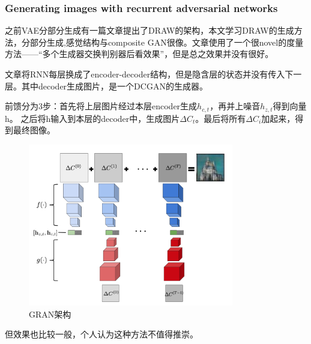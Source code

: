 \documentclass[a4paper]{article}
\begin{document}
\subsubsection{Generating images with recurrent adversarial networks\cite{gran}}
之前VAE分部分生成有一篇文章提出了DRAW的架构，本文学习DRAW的生成方法，分部分生成,感觉结构与composite GAN很像。文章使用了一个很novel的度量方法——“多个生成器交换判别器后看效果”，但是总之效果并没有很好。

文章将RNN每层换成了encoder-decoder结构，但是隐含层的状态并没有传入下一层。其中decoder生成图片，是一个DCGAN的生成器。

前馈分为3步：首先将上层图片经过本层encoder生成$h_{c,t}$，再并上噪音$h_{z,t}$得到向量h。
之后将h输入到本层的decoder中，生成图片$\Delta C_t$。最后将所有$\Delta C_i$加起来，得到最终图像。
\begin{figure}
\centering
\includegraphics[width=0.8\textwidth]{./img/38.png}
\caption{GRAN架构}
\label{fig:38}
\end{figure}

但效果也比较一般，个人认为这种方法不值得推崇。
\end{document}
